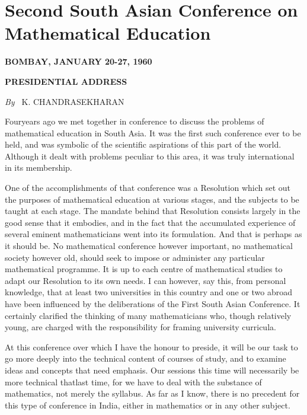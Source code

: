 
\chapter{Second South Asian Conference on Mathematical Education}

\begin{center}
\textbf{BOMBAY, JANUARY 20-27, 1960}\\
\medskip

\textbf{PRESIDENTIAL ADDRESS}

\medskip
{\em By~} K. CHANDRASEKHARAN
\end{center}


Four\pageoriginale years ago we met together in conference to discuss the problems
of mathematical education in South Asia. It was the first such
conference ever to be held, and was symbolic of the scientific
aspirations of this part of the world. Although it dealt with problems
peculiar to this area, it was truly international in its membership.

One of the accomplishments of that conference was a Resolution which
set out the purposes of mathematical education at various stages, and
the subjects to be taught at each stage. The mandate behind that
Resolution consists largely in the good sense that it embodies, and in
the fact that the accumulated experience of several eminent
mathematicians went into its formulation. And that is perhaps as it
should be. No mathematical conference however important, no
mathematical society however old, should seek to impose or administer
any particular mathematical programme. It is up to each centre of
mathematical studies to adapt our Resolution to its own needs. I can
however, say this, from personal knowledge, that at least two
universities in this country and one or two abroad have been
influenced by the deliberations of the First South Asian
Conference. It certainly clarified the thinking of many mathematicians
who, though relatively young, are charged with the responsibility for
framing university curricula.

At this conference over which I have the honour to preside, it will be
our task to go more deeply into the technical content of courses of
study, and to examine ideas and concepts that need emphasis. Our
sessions this time will necessarily be more technical that\pageoriginale last time,
for we have to deal with the substance of mathematics, not merely the
syllabus. As far as I know, there is no precedent for this type of
conference in India, either in mathematics or in any other subject.

